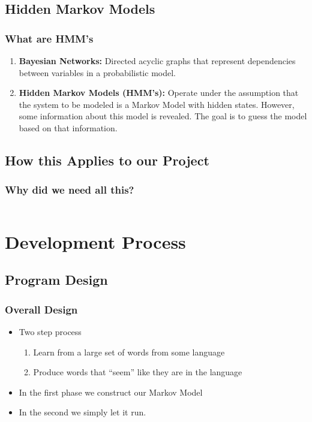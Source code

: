 \documentclass{beamer}
\begin{document}
\subsection{Hidden Markov Models}
\begin{frame}
   \frametitle{What are HMM's}
   \begin{enumerate}
   \pause
   \item[] \small{\textbf{Bayesian Networks:} Directed acyclic graphs that
   represent dependencies between variables in a probabilistic model.}
   \pause
   \item[] \small{\textbf{Hidden Markov Models (HMM's):} Operate under the
   assumption that the system to be modeled is a Markov Model with hidden
   states. However, some information about this model is revealed. The goal is
   to guess the model based on that information.}
   \end{enumerate}
\end{frame}

\subsection{How this Applies to our Project}
\begin{frame}
   \frametitle{Why did we need all this?}
   \begin{columns}[c]
      \column{1.5in}
      \column{1.5in}
   \end{columns}
\end{frame}

\section{Development Process}

\subsection{Program Design}
\begin{frame}
   \frametitle{Overall Design}
   \begin{itemize}
      \item Two step process
      \begin{enumerate}
         \item Learn from a large set of words from some language
         \item Produce words that ``seem'' like they are in the language
      \end{enumerate}
      \item In the first phase we construct our Markov Model
      \item In the second we simply let it run.
   \end{itemize}
\end{frame}
\end{document}
